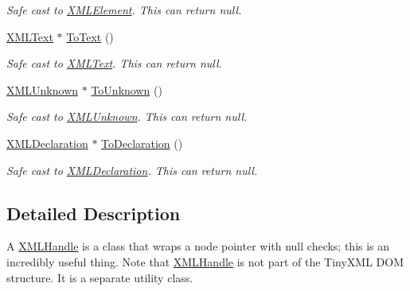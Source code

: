 \begin{DoxyCompactItemize}
\begin{DoxyCompactList}\small\item\em Safe cast to \hyperlink{classtinyxml2_1_1_x_m_l_element}{X\-M\-L\-Element}. This can return null. \end{DoxyCompactList}\item 
\hypertarget{classtinyxml2_1_1_x_m_l_handle_a4b964d1ad08d1376aaa374ffc920782a}{\hyperlink{classtinyxml2_1_1_x_m_l_text}{X\-M\-L\-Text} $\ast$ \hyperlink{classtinyxml2_1_1_x_m_l_handle_a4b964d1ad08d1376aaa374ffc920782a}{To\-Text} ()}\label{classtinyxml2_1_1_x_m_l_handle_a4b964d1ad08d1376aaa374ffc920782a}

\begin{DoxyCompactList}\small\item\em Safe cast to \hyperlink{classtinyxml2_1_1_x_m_l_text}{X\-M\-L\-Text}. This can return null. \end{DoxyCompactList}\item 
\hypertarget{classtinyxml2_1_1_x_m_l_handle_a6d44845748f2021b0bf8b931a6efa0e4}{\hyperlink{classtinyxml2_1_1_x_m_l_unknown}{X\-M\-L\-Unknown} $\ast$ \hyperlink{classtinyxml2_1_1_x_m_l_handle_a6d44845748f2021b0bf8b931a6efa0e4}{To\-Unknown} ()}\label{classtinyxml2_1_1_x_m_l_handle_a6d44845748f2021b0bf8b931a6efa0e4}

\begin{DoxyCompactList}\small\item\em Safe cast to \hyperlink{classtinyxml2_1_1_x_m_l_unknown}{X\-M\-L\-Unknown}. This can return null. \end{DoxyCompactList}\item 
\hypertarget{classtinyxml2_1_1_x_m_l_handle_a2c173ff79c0adee19e9de9eeb3a9e8e2}{\hyperlink{classtinyxml2_1_1_x_m_l_declaration}{X\-M\-L\-Declaration} $\ast$ \hyperlink{classtinyxml2_1_1_x_m_l_handle_a2c173ff79c0adee19e9de9eeb3a9e8e2}{To\-Declaration} ()}\label{classtinyxml2_1_1_x_m_l_handle_a2c173ff79c0adee19e9de9eeb3a9e8e2}

\begin{DoxyCompactList}\small\item\em Safe cast to \hyperlink{classtinyxml2_1_1_x_m_l_declaration}{X\-M\-L\-Declaration}. This can return null. \end{DoxyCompactList}\end{DoxyCompactItemize}


\subsection{Detailed Description}
A \hyperlink{classtinyxml2_1_1_x_m_l_handle}{X\-M\-L\-Handle} is a class that wraps a node pointer with null checks; this is an incredibly useful thing. Note that \hyperlink{classtinyxml2_1_1_x_m_l_handle}{X\-M\-L\-Handle} is not part of the Tiny\-X\-M\-L D\-O\-M structure. It is a separate utility class.

